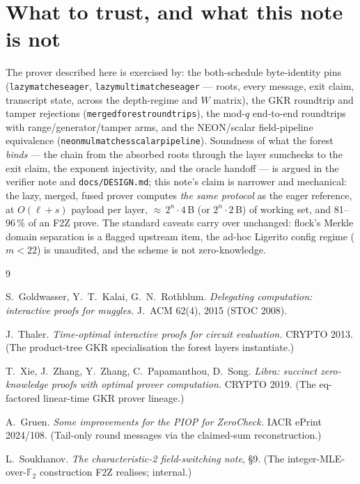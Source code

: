 \documentclass[11pt]{article}
\newcommand{\F}{\mathbb{F}}
\newcommand{\Ftwo}{\F_2}
\newcommand{\code}[1]{{\def\_{\textunderscore\allowbreak}\texttt{#1}}}
\theoremstyle{definition}
\begin{document}
\section{What to trust, and what this note is not}
\label{sec:trust}

The prover described here is exercised by: the both-schedule
byte-identity pins (\code{lazy\_matches\_eager},
\code{lazy\_multi\_matches\_eager} --- roots, every message, exit
claim, transcript state, across the depth-regime and $W$ matrix), the
GKR roundtrip and tamper rejections (\code{merged\_forest\_roundtrips}),
the mod-$q$ end-to-end roundtrips with range/generator/tamper arms, and
the NEON/scalar field-pipeline equivalence
(\code{neon\_mul\_matches\_scalar\_pipeline}).  Soundness of what the
forest \emph{binds} --- the chain from the absorbed roots through the
layer sumchecks to the exit claim, the exponent injectivity, and the
oracle handoff --- is argued in the verifier note and
\code{docs/DESIGN.md}; this note's claim is narrower and mechanical:
the lazy, merged, fused prover computes \emph{the same protocol} as the
eager reference, at $O(\ell + s)$ payload per layer,
${\approx}\,2^n\cdot4$\,B (or $2^n\cdot2$\,B) of working set, and
81--96\,\% of an F2Z prove.  The standard caveats carry over unchanged:
flock's Merkle domain separation is a flagged upstream item, the
ad-hoc Ligerito config regime ($m < 22$) is unaudited, and the scheme
is not zero-knowledge.

\begin{thebibliography}{9}\small

 S.~Goldwasser, Y.~T.~Kalai, G.~N.~Rothblum.
\emph{Delegating computation: interactive proofs for muggles.}
J.~ACM 62(4), 2015 (STOC 2008).

 J.~Thaler.
\emph{Time-optimal interactive proofs for circuit evaluation.}
CRYPTO 2013.  (The product-tree GKR specialisation the forest layers
instantiate.)

 T.~Xie, J.~Zhang, Y.~Zhang, C.~Papamanthou, D.~Song.
\emph{Libra: succinct zero-knowledge proofs with optimal prover
computation.}  CRYPTO 2019.  (The eq-factored linear-time GKR prover
lineage.)

 A.~Gruen.
\emph{Some improvements for the PIOP for ZeroCheck.}
IACR ePrint 2024/108.  (Tail-only round messages via the claimed-sum
reconstruction.)

 L.~Soukhanov.
\emph{The characteristic-2 field-switching note}, \S9.  (The
integer-MLE-over-$\Ftwo$ construction F2Z realises; internal.)

\end{thebibliography}
\end{document}
